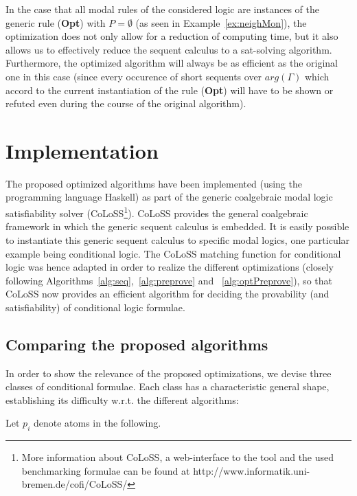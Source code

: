 \documentclass{entcs} \usepackage{entcsmacro}
\begin{document}
\begin{remark}
In the case that all modal rules of the considered logic are instances of
the generic rule (\textbf{Opt}) with $P=\emptyset$ (as seen in Example~\ref{ex:neighMon}),
the optimization does not only allow for a reduction of computing time, but
it also allows us to effectively reduce the sequent calculus to a sat-solving
algorithm.
Furthermore, the optimized algorithm will always be as efficient as the
original one in this case (since every occurence of short sequents over $arg(\Gamma)$ 
which accord to the current instantiation of the rule (\textbf{Opt}) will
have to be shown or refuted even during the course of the original algorithm).
\end{remark}

\section{Implementation}

The proposed optimized algorithms have been implemented (using the programming
language Haskell) as part of the generic coalgebraic modal logic satisfiability
solver (CoLoSS\footnote{More information about CoLoSS, a web-interface to the tool and 
the used benchmarking formulae can be found at http://www.informatik.uni-bremen.de/cofi/CoLoSS/}).
CoLoSS provides the general coalgebraic framework in which the generic
sequent calculus is embedded. It is easily possible to instantiate this generic sequent
calculus to specific modal logics, one particular example being conditional logic.
The CoLoSS matching function for conditional logic was hence adapted in order to realize
the different optimizations (closely following Algorithms~\ref{alg:seq},~\ref{alg:preprove} and
~\ref{alg:optPreprove}), so that CoLoSS now provides an efficient algorithm for
deciding the provability (and satisfiability) of conditional logic formulae.

\subsection{Comparing the proposed algorithms}

In order to show the relevance of the proposed optimizations, we devise three classes
of conditional formulae. Each class has a characteristic general shape, establishing its
difficulty w.r.t. the different algorithms:

Let $p_i$ denote atoms in the following.
\end{document}
